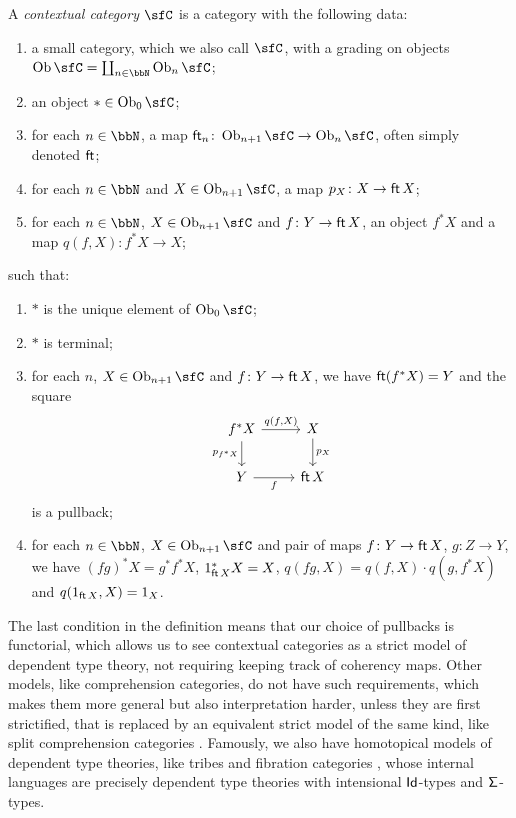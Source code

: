 \begin{defn}
  A \emph{contextual category} $\sfC$ is a category with the following data:
  \begin{enumerate}
    \item a small category, which we also call $\sfC$, with a grading on objects
      $\Ob\sfC=\coprod_{n\in\bbN}\Ob_n\sfC$;
    \item an object $*\in\Ob_0\sfC$;
    \item for each $n\in\bbN$, a map
      $\cft_n\colon\Ob_{n+1}\sfC\rightarrow\Ob_n\sfC$, often simply denoted
      $\operatorname{\mathsf{ft}}$;
    \item for each $n\in\bbN$ and $X\in\Ob_{n+1}\sfC$, a map $p_X\colon
      X\rightarrow\operatorname{\mathsf{ft}} X$;
    \item for each $n\in\bbN$, $X\in\Ob_{n+1}\sfC$ and $f\colon Y\rightarrow
      \operatorname{\mathsf{ft}} X$, an object $f^*X$ and a map $q(f,X)\colon f^*X\rightarrow X$;
  \end{enumerate}
  such that:
  \begin{enumerate}
    \item $*$ is the unique element of $\Ob_0\sfC$;
    \item $*$ is terminal;
    \item for each $n$, $X\in\Ob_{n+1}\sfC$ and $f\colon Y\rightarrow \operatorname{\mathsf{ft}} X$, we
      have $\operatorname{\mathsf{ft}}(f^*X)=Y$ and the square
      \[\begin{tikzcd}
        {f^*X} & X \\
        Y & \cft X
        \arrow["f"', from=2-1, to=2-2]
        \arrow["{p_X}", from=1-2, to=2-2]
        \arrow["{q(f,X)}", from=1-1, to=1-2]
        \arrow["{p_{f^*X}}"', from=1-1, to=2-1]
      \end{tikzcd}\]
      is a pullback;
    \item for each $n\in\bbN$, $X\in\Ob_{n+1}\sfC$ and pair of maps $f\colon
      Y\rightarrow \operatorname{\mathsf{ft}} X$, $g\colon Z\rightarrow Y$, we have $(fg)^*X=g^*f^*X$,
      $1^*_{\operatorname{\mathsf{ft}} X}X=X$, $q(fg,X)=q(f,X)\cdot q(g,f^*X)$ and $q(1_{\operatorname{\mathsf{ft}} X},X)=1_X$.
  \end{enumerate}
\end{defn}

\begin{rmk}
  The last condition in the definition means that our choice of pullbacks is
  functorial, which allows us to see contextual categories as a strict model of
  dependent type theory, not requiring keeping track of coherency maps.
  Other models, like comprehension categories, do not
  have such requirements, which makes them more general but also
  interpretation harder, unless they are first strictified, that is replaced by
  an equivalent strict model of the same kind, like split comprehension
  categories . Famously, we also have
  homotopical models of dependent type
  theories, like tribes and fibration categories , whose
  internal languages are precisely dependent type theories with intensional
  $\operatorname{\mathsf{Id}}$-types and $\operatorname{\mathsf{\Sigma}}$-types.
\end{rmk}

